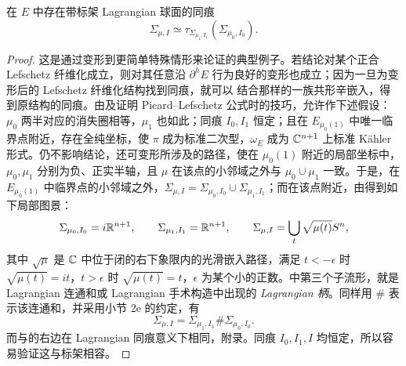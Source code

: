 \begin{lemma}\label{st:16.13}
在 $E$ 中存在带标架 Lagrangian 球面的同痕
\begin{equation}\label{eq:16.10}
\Sigma_{\mu,I}\simeq\tau_{\Sigma_{\mu_1,I_1}}(\Sigma_{\mu_0,I_0}).
\end{equation}
\end{lemma}
\begin{proof}
这是通过变形到更简单特殊情形来论证的典型例子。若结论对某个正合 Lefschetz 纤维化成立，则对其任意沿 $\partial^hE$ 行为良好的变形也成立；因为一旦为变形后的 Lefschetz 纤维化结构找到同痕，就可以
结合那样的一族共形辛嵌入，得到原结构的同痕。由及证明 Picard–Lefschetz 公式时的技巧，允许作下述假设：$\mu_0$ 两半对应的消失圈相等，$\mu_1$ 也如此；同痕 $I_0,I_1$ 恒定；且在 $E_{\mu_0(1)}$ 中唯一临界点附近，存在全纯坐标，使 $\pi$ 成为标准二次型，$\omega_E$ 成为 $\mathbb C^{n+1}$ 上标准 Kähler 形式。仍不影响结论，还可变形所涉及的路径，使在 $\mu_0(1)$ 附近的局部坐标中，$\mu_0,\mu_1$ 分别为负、正实半轴，且 $\mu$ 在该点的小邻域之外与 $\mu_0\cup\mu_1$ 一致。于是，在 $E_{\mu_0(1)}$ 中临界点的小邻域之外，$\Sigma_{\mu,I}=\Sigma_{\mu_0,I_0}\cup\Sigma_{\mu_1,I_1}$；而在该点附近，由得到如下局部图景：
\begin{equation}\label{eq:16.11}
\Sigma_{\mu_0,I_0}=i\mathbb R^{n+1},\qquad
\Sigma_{\mu_1,I_1}=\mathbb R^{n+1},\qquad
\Sigma_{\mu,I}=\bigcup_t\sqrt{\mu(t)}S^n,
\end{equation}
其中 $\sqrt\mu$ 是 $\mathbb C$ 中位于闭的右下象限内的光滑嵌入路径，满足 $t<-\epsilon$ 时 $\sqrt{\mu(t)}=it$，$t>\epsilon$ 时 $\sqrt{\mu(t)}=t$，$\epsilon$ 为某个小的正数。中第三个子流形，就是 Lagrangian 连通和或 Lagrangian 手术构造中出现的 \emph{Lagrangian 柄}。同样用 $\#$ 表示该连通和，并采用小节 2e 的约定，有
\begin{equation}\label{eq:16.12}
\Sigma_{\mu,I}=\Sigma_{\mu_1,I_1}\#\Sigma_{\mu_0,I_0}.
\end{equation}
而与的右边在 Lagrangian 同痕意义下相同，附录。同痕 $I_0,I_1,I$ 均恒定，所以容易验证这与标架相容。
\end{proof}

